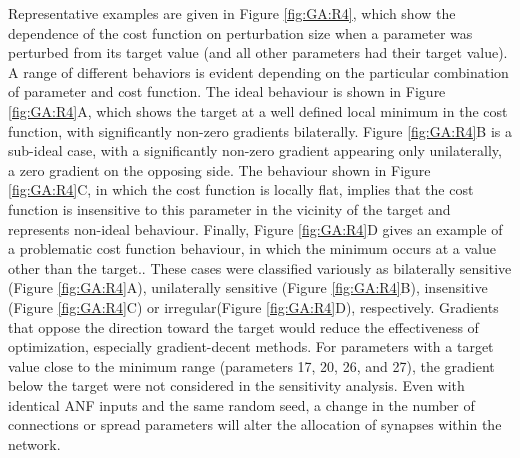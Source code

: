 Representative examples are given in Figure \ref{fig:GA:R4}, which show
the dependence of the cost function on perturbation size when a
parameter was perturbed from its target value (and all other
parameters had their target value). A range of different behaviors is
evident depending on the particular combination of parameter and cost
function. The ideal behaviour is shown in Figure \ref{fig:GA:R4}A, which
shows the target at a well defined local minimum in the cost function,
with significantly non-zero gradients bilaterally. Figure
\ref{fig:GA:R4}B is a sub-ideal case, with a significantly non-zero
gradient appearing only unilaterally, a zero gradient on the opposing
side.  The behaviour shown in Figure \ref{fig:GA:R4}C, in which the cost
function is locally flat, implies that the cost function is
insensitive to this parameter in the vicinity of the target and
represents non-ideal behaviour. Finally, Figure \ref{fig:GA:R4}D gives an
example of a problematic cost function behaviour, in which the minimum
occurs at a value other than the target.. These cases were
classified variously as bilaterally sensitive (Figure \ref{fig:GA:R4}A),
unilaterally sensitive (Figure \ref{fig:GA:R4}B), insensitive (Figure
\ref{fig:GA:R4}C) or irregular(Figure \ref{fig:GA:R4}D), respectively.
Gradients that oppose the direction toward the target
would reduce the effectiveness of optimization, especially
gradient-decent methods.  For parameters with a target value close to
the minimum range (parameters 17, 20, 26, and 27), the gradient below
the target were not considered in the sensitivity analysis.  Even with
identical ANF inputs and the same random seed, a change in the number
of connections or spread parameters will alter the allocation of
synapses within the network.



